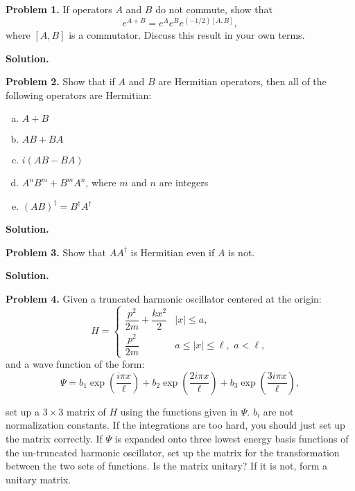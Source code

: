 \documentclass[letterpaper]{article}
\begin{document}
\insertTitle


\textbf{Problem 1.} If operators $A$ and $B$ do not commute, show that
\begin{equation*}
    e^{A+B} = e^Ae^Be^{(-1/2)[A,B]},
\end{equation*}
where $[A,B]$ is a commutator. Discuss this result in your own terms.
 
\textbf{Solution.}
\hr

\textbf{Problem 2.} Show that if $A$ and $B$ are Hermitian operators, then all of the following operators are Hermitian:
\begin{enumerate}[(a)]
    \item $A+B$
    \item $AB+BA$
    \item $i(AB-BA)$
    \item $A^nB^m + B^mA^n$, where $m$ and $n$ are integers
    \item $(AB)^\dagger = B^\dagger A^\dagger$
\end{enumerate}

\textbf{Solution.}
\hr

\textbf{Problem 3.} Show that $AA^\dagger$ is Hermitian even if $A$ is not.

\textbf{Solution.}
\hr

\textbf{Problem 4.} Given a truncated harmonic oscillator centered at the origin:
\begin{equation*}
    H = 
    \begin{cases} 
        \dfrac{p^2}{2m} + \dfrac{kx^2}{2} & |x| \leq a, \\[1em]
        \dfrac{p^2}{2m} & a \leq |x| \leq \ell, \,\, a < \ell,
    \end{cases}
\end{equation*}
and a wave function of the form:
\begin{equation*}
    \Psi = b_1\exp\left(\frac{i\pi x}{\ell}\right) + b_2\exp\left(\frac{2i\pi x}{\ell}\right) + b_3\exp\left(\frac{3i\pi x}{\ell}\right),
\end{equation*}

set up a $3\times 3$ matrix of $H$ using the functions given in $\Psi$. $b_i$ are not normalization constants. If the integrations are too hard, you should just set up the matrix correctly. If $\Psi$ is expanded onto three lowest energy basis functions of the un-truncated harmonic oscillator, set up the matrix for the transformation between the two sets of functions. Is the matrix unitary? If it is not, form a unitary matrix.
\end{document}
